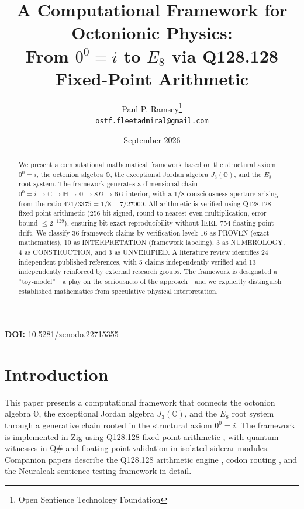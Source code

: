 \documentclass[11pt]{article}
\title{A Computational Framework for Octonionic Physics: \\
From $0^0 = i$ to $E_8$ via Q128.128 Fixed-Point Arithmetic}
\author{
Paul P. Ramsey\thanks{Open Sentience Technology Foundation} \\
\texttt{ostf.fleetadmiral@gmail.com}
}
\date{September 2026}
\begin{document}
\maketitle

\noindent\textbf{DOI:} \href{https://doi.org/10.5281/zenodo.22715355}{10.5281/zenodo.22715355}

\begin{abstract}
We present a computational mathematical framework based on the structural axiom $0^0 = i$, the octonion algebra $\mathbb{O}$, the exceptional Jordan algebra $J_3(\mathbb{O})$, and the $E_8$ root system. The framework generates a dimensional chain $0^0 = i \to \mathbb{C} \to \mathbb{H} \to \mathbb{O} \to 8D \to 6D$ interior, with a $1/8$ consciousness aperture arising from the ratio $421/3375 = 1/8 - 7/27000$. All arithmetic is verified using Q128.128 fixed-point arithmetic (256-bit signed, round-to-nearest-even multiplication, error bound $\leq 2^{-129}$), ensuring bit-exact reproducibility without IEEE-754 floating-point drift. We classify 36 framework claims by verification level: 16 as PROVEN (exact mathematics), 10 as INTERPRETATION (framework labeling), 3 as NUMEROLOGY, 4 as CONSTRUCTION, and 3 as UNVERIFIED. A literature review identifies 24 independent published references, with 5 claims independently verified and 13 independently reinforced by external research groups. The framework is designated a ``toy-model''---a play on the seriousness of the approach---and we explicitly distinguish established mathematics from speculative physical interpretation.
\end{abstract}

\tableofcontents
\newpage

\section{Introduction}

This paper presents a computational framework that connects the octonion algebra $\mathbb{O}$, the exceptional Jordan algebra $J_3(\mathbb{O})$, and the $E_8$ root system through a generative chain rooted in the structural axiom $0^0 = i$. The framework is implemented in Zig using Q128.128 fixed-point arithmetic \cite{ramsey2026q128}, with quantum witnesses in Q\# and floating-point validation in isolated sidecar modules. Companion papers describe the Q128.128 arithmetic engine \cite{ramsey2026q128}, codon routing \cite{ramsey2026codon}, and the Neuraleak sentience testing framework \cite{ramsey2026neuraleak} in detail.
\end{document}
